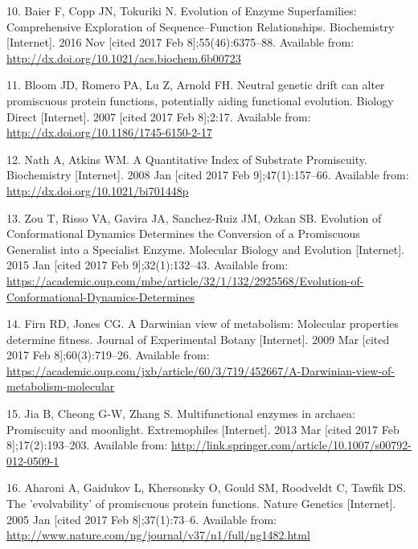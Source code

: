 \documentclass[12pt,twoside]{reedthesis}
\begin{document}
  \hypertarget{ref-baier_evolution_2016}{}
  10. Baier F, Copp JN, Tokuriki N. Evolution of Enzyme Superfamilies:
  Comprehensive Exploration of Sequence--Function Relationships.
  Biochemistry {[}Internet{]}. 2016 Nov {[}cited 2017 Feb
  8{]};55(46):6375--88. Available from:
  \url{http://dx.doi.org/10.1021/acs.biochem.6b00723}
  
  \hypertarget{ref-bloom_neutral_2007}{}
  11. Bloom JD, Romero PA, Lu Z, Arnold FH. Neutral genetic drift can
  alter promiscuous protein functions, potentially aiding functional
  evolution. Biology Direct {[}Internet{]}. 2007 {[}cited 2017 Feb
  8{]};2:17. Available from:
  \url{http://dx.doi.org/10.1186/1745-6150-2-17}
  
  \hypertarget{ref-nath_quantitative_2008}{}
  12. Nath A, Atkins WM. A Quantitative Index of Substrate Promiscuity.
  Biochemistry {[}Internet{]}. 2008 Jan {[}cited 2017 Feb
  9{]};47(1):157--66. Available from:
  \url{http://dx.doi.org/10.1021/bi701448p}
  
  \hypertarget{ref-zou_evolution_2015}{}
  13. Zou T, Risso VA, Gavira JA, Sanchez-Ruiz JM, Ozkan SB. Evolution of
  Conformational Dynamics Determines the Conversion of a Promiscuous
  Generalist into a Specialist Enzyme. Molecular Biology and Evolution
  {[}Internet{]}. 2015 Jan {[}cited 2017 Feb 9{]};32(1):132--43. Available
  from:
  \url{https://academic.oup.com/mbe/article/32/1/132/2925568/Evolution-of-Conformational-Dynamics-Determines}
  
  \hypertarget{ref-firn_darwinian_2009}{}
  14. Firn RD, Jones CG. A Darwinian view of metabolism: Molecular
  properties determine fitness. Journal of Experimental Botany
  {[}Internet{]}. 2009 Mar {[}cited 2017 Feb 8{]};60(3):719--26. Available
  from:
  \url{https://academic.oup.com/jxb/article/60/3/719/452667/A-Darwinian-view-of-metabolism-molecular}
  
  \hypertarget{ref-jia_multifunctional_2013}{}
  15. Jia B, Cheong G-W, Zhang S. Multifunctional enzymes in archaea:
  Promiscuity and moonlight. Extremophiles {[}Internet{]}. 2013 Mar
  {[}cited 2017 Feb 8{]};17(2):193--203. Available from:
  \url{http://link.springer.com/article/10.1007/s00792-012-0509-1}
  
  \hypertarget{ref-aharoni_evolvability_2005}{}
  16. Aharoni A, Gaidukov L, Khersonsky O, Gould SM, Roodveldt C, Tawfik
  DS. The 'evolvability' of promiscuous protein functions. Nature Genetics
  {[}Internet{]}. 2005 Jan {[}cited 2017 Feb 8{]};37(1):73--6. Available
  from: \url{http://www.nature.com/ng/journal/v37/n1/full/ng1482.html}
  
\end{document}
